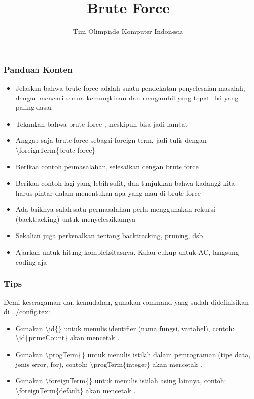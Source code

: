 

\title{Brute Force}
\author{Tim Olimpiade Komputer Indonesia}
\date{}



\begin{frame}
\titlepage
\end{frame}

\begin{frame}
\frametitle{Panduan Konten}
\begin{itemize}
  \item Jelaskan bahwa brute force adalah suatu pendekatan penyelesaian masalah, dengan mencari semua kemungkinan dan mengambil yang tepat. Ini yang paling dasar
  \item Tekankan bahwa brute force , meskipun bisa jadi lambat
  \item Anggap saja brute force sebagai foreign term, jadi tulis dengan \textbackslash foreignTerm\{brute force\}
  \item Berikan contoh permasalahan, selesaikan dengan brute force
  \item Berikan contoh lagi yang lebih sulit, dan tunjukkan bahwa kadang2 kita harus pintar dalam menentukan apa yang mau di-brute force
  \item Ada baiknya salah satu permasalahan perlu menggunakan rekursi (backtracking) untuk menyelesaikannya
  \item Sekalian juga perkenalkan tentang backtracking, pruning, dsb
  \item Ajarkan untuk hitung kompleksitasnya. Kalau cukup untuk AC, langsung coding aja
\end{itemize}
\end{frame}

\begin{frame}
\frametitle{Tips}
Demi keseragaman dan kemudahan, gunakan command yang sudah didefinisikan di ../config.tex:
\begin{itemize}
  \item Gunakan \textbackslash id\{\} untuk menulis identifier (nama fungsi, variabel), contoh: \textbackslash id\{primeCount\} akan mencetak .
  \item Gunakan \textbackslash progTerm\{\} untuk menulis istilah dalam pemrograman (tipe data, jenis error, for), contoh: \textbackslash progTerm\{integer\} akan mencetak .
  \item Gunakan \textbackslash foreignTerm\{\} untuk menulis istilah asing lainnya, contoh: \textbackslash foreignTerm\{default\} akan mencetak .
\end{itemize}
\end{frame}

